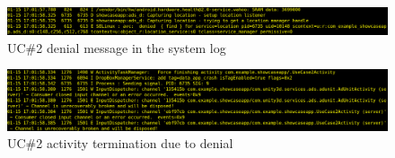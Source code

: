 \begin{figure}[h]
  \centering
  \includegraphics[width=\textwidth]{chapters/seapp/figs/ae/uc25.png}
  \caption{\label{fig:seapp_uc2_logcat1} UC\#2 \sel denial message in the system log}
\end{figure}      

\begin{figure}[h]
  \centering
  \includegraphics[width=\textwidth]{chapters/seapp/figs/ae/uc26.png}
  \caption{\label{fig:seapp_uc2_logcat2} UC\#2 activity termination due to \sel denial}
\end{figure}      



